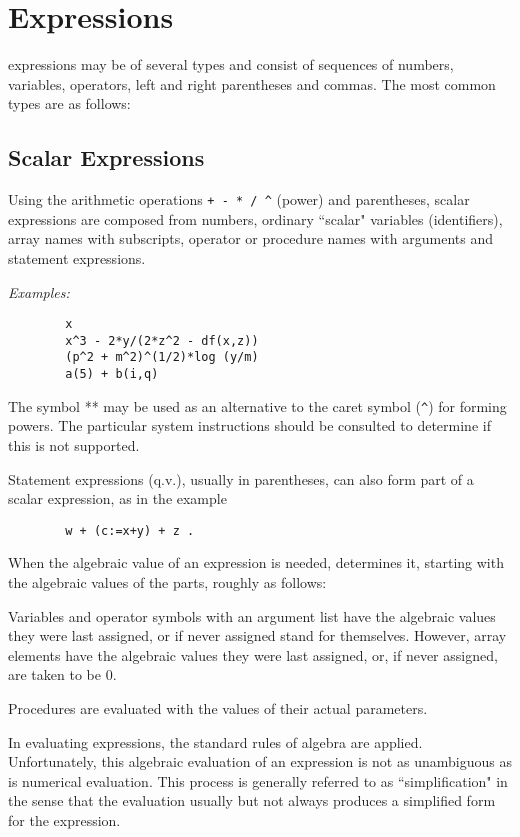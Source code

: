\chapter{Expressions}

{\REDUCE} expressions may be of several types and consist
of sequences of numbers, variables, operators, left and right parentheses
and commas.  The most common types are as follows:

\section{Scalar Expressions}

Using the arithmetic operations {\tt + - * / \^{ }}
(power) and parentheses, scalar expressions are composed from numbers,
ordinary ``scalar" variables (identifiers), array names with subscripts,
operator or procedure names with arguments and statement expressions.

{\it Examples:}
\begin{verbatim}
        x
        x^3 - 2*y/(2*z^2 - df(x,z))
        (p^2 + m^2)^(1/2)*log (y/m)
        a(5) + b(i,q)
\end{verbatim}
The symbol ** may be used as an alternative to the caret symbol
(\verb+^+) for forming powers.  The particular system instructions should
be consulted to determine if this is not supported.

Statement expressions (q.v.), usually in parentheses, can also form part of
a scalar expression, as in the example
\begin{verbatim}
        w + (c:=x+y) + z .
\end{verbatim}
When the algebraic value of an expression is needed, {\REDUCE} determines it,
starting with the algebraic values of the parts, roughly as follows:

Variables and operator symbols with an argument list have the algebraic
values they were last assigned, or if never assigned stand for themselves.
However, array elements have the algebraic values they were last assigned,
or, if never assigned, are taken to be 0.

Procedures are evaluated with the values of their actual parameters.

In evaluating expressions, the standard rules of algebra are applied.
Unfortunately, this algebraic evaluation of an expression is not as
unambiguous as is numerical evaluation. This process is generally referred
to as ``simplification" in the sense that the
evaluation usually but not always produces a simplified form for the
expression.

